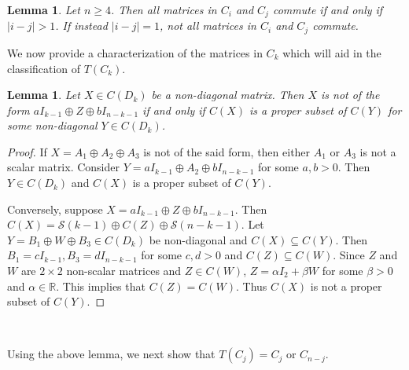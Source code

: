 \documentclass[11pt,reqno]{amsart}
\theoremstyle{plain}
\newtheorem{lemma}[theorem]{Lemma}
\theoremstyle{definition}
\numberwithin{equation}{section}
\def\cS{\mathcal S}
\begin{document}
\begin{lemma}\label{pc-3}
	Let $n \ge 4$.  Then all matrices in $C_i$ and $C_j$ commute if and only if $|i-j| > 1$. If instead $|i-j| =1$, not all matrices in $C_i$ and $C_j$ commute.
\end{lemma}
 We now provide a characterization of the matrices in $C_k$ which will aid in the classification of $T(C_k)$. 
\begin{lemma}\label{pc-05}
	Let  $X \in C(D_k)$  be a non-diagonal matrix.  Then $X$ is not of the form 
	$aI_{k-1} \oplus Z \oplus bI_{n-k-1}$ if and only if  $C(X)$ is a proper subset of $C(Y)$ for some non-diagonal $Y\in C(D_k)$.
\end{lemma}
\begin{proof}
	If $X = A_1 \oplus A_2 \oplus A_3$ is not of the said form,
	then either $A_1$ or $A_3$ is not a scalar matrix. Consider
	$Y = aI_{k-1} \oplus A_2 \oplus bI_{n-k-1}$ for some $a, b > 0$. Then $Y\in C(D_k)$ and 
	$C(X)$ is a proper subset of $C(Y)$.
	
	Conversely, suppose $X = aI_{k-1} \oplus Z \oplus bI_{n-k-1}$. Then 
	$C(X) = \cS(k-1) \oplus C(Z) \oplus \cS(n-k-1)$.
	Let $Y = B_1 \oplus W \oplus B_3 \in C(D_k)$ be non-diagonal and $C(X) \subseteq C(Y)$. Then  $B_1=cI_{k-1}, B_3=dI_{n-k-1}$ for some $c,d>0$ and $C(Z) \subseteq C(W)$. Since $Z$ and $W$ are $2 \times 2$ non-scalar  matrices and $Z \in C(W)$, $Z=\alpha I_2+\beta W$ for some $\beta>0$ and $\alpha\in \mathbb{R}$. This implies that $C(Z)=C(W)$. Thus $C(X)$ is not a proper subset of $C(Y)$.
\end{proof}
~~~~~~~~~~~~~~

Using the above lemma, we next show that $T(C_j)=C_j$ or $C_{n-j}$.
\end{document}
